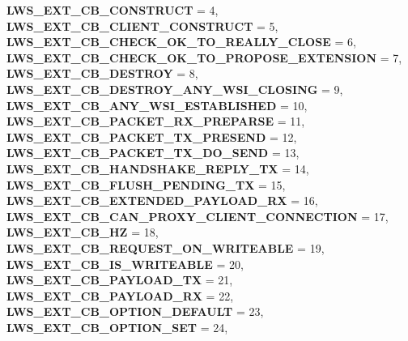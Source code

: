 \begin{DoxyCompactItemize}
{\bfseries L\+W\+S\+\_\+\+E\+X\+T\+\_\+\+C\+B\+\_\+\+C\+O\+N\+S\+T\+R\+U\+CT} = 4, 
\newline
{\bfseries L\+W\+S\+\_\+\+E\+X\+T\+\_\+\+C\+B\+\_\+\+C\+L\+I\+E\+N\+T\+\_\+\+C\+O\+N\+S\+T\+R\+U\+CT} = 5, 
{\bfseries L\+W\+S\+\_\+\+E\+X\+T\+\_\+\+C\+B\+\_\+\+C\+H\+E\+C\+K\+\_\+\+O\+K\+\_\+\+T\+O\+\_\+\+R\+E\+A\+L\+L\+Y\+\_\+\+C\+L\+O\+SE} = 6, 
{\bfseries L\+W\+S\+\_\+\+E\+X\+T\+\_\+\+C\+B\+\_\+\+C\+H\+E\+C\+K\+\_\+\+O\+K\+\_\+\+T\+O\+\_\+\+P\+R\+O\+P\+O\+S\+E\+\_\+\+E\+X\+T\+E\+N\+S\+I\+ON} = 7, 
{\bfseries L\+W\+S\+\_\+\+E\+X\+T\+\_\+\+C\+B\+\_\+\+D\+E\+S\+T\+R\+OY} = 8, 
\newline
{\bfseries L\+W\+S\+\_\+\+E\+X\+T\+\_\+\+C\+B\+\_\+\+D\+E\+S\+T\+R\+O\+Y\+\_\+\+A\+N\+Y\+\_\+\+W\+S\+I\+\_\+\+C\+L\+O\+S\+I\+NG} = 9, 
{\bfseries L\+W\+S\+\_\+\+E\+X\+T\+\_\+\+C\+B\+\_\+\+A\+N\+Y\+\_\+\+W\+S\+I\+\_\+\+E\+S\+T\+A\+B\+L\+I\+S\+H\+ED} = 10, 
{\bfseries L\+W\+S\+\_\+\+E\+X\+T\+\_\+\+C\+B\+\_\+\+P\+A\+C\+K\+E\+T\+\_\+\+R\+X\+\_\+\+P\+R\+E\+P\+A\+R\+SE} = 11, 
{\bfseries L\+W\+S\+\_\+\+E\+X\+T\+\_\+\+C\+B\+\_\+\+P\+A\+C\+K\+E\+T\+\_\+\+T\+X\+\_\+\+P\+R\+E\+S\+E\+ND} = 12, 
\newline
{\bfseries L\+W\+S\+\_\+\+E\+X\+T\+\_\+\+C\+B\+\_\+\+P\+A\+C\+K\+E\+T\+\_\+\+T\+X\+\_\+\+D\+O\+\_\+\+S\+E\+ND} = 13, 
{\bfseries L\+W\+S\+\_\+\+E\+X\+T\+\_\+\+C\+B\+\_\+\+H\+A\+N\+D\+S\+H\+A\+K\+E\+\_\+\+R\+E\+P\+L\+Y\+\_\+\+TX} = 14, 
{\bfseries L\+W\+S\+\_\+\+E\+X\+T\+\_\+\+C\+B\+\_\+\+F\+L\+U\+S\+H\+\_\+\+P\+E\+N\+D\+I\+N\+G\+\_\+\+TX} = 15, 
{\bfseries L\+W\+S\+\_\+\+E\+X\+T\+\_\+\+C\+B\+\_\+\+E\+X\+T\+E\+N\+D\+E\+D\+\_\+\+P\+A\+Y\+L\+O\+A\+D\+\_\+\+RX} = 16, 
\newline
{\bfseries L\+W\+S\+\_\+\+E\+X\+T\+\_\+\+C\+B\+\_\+\+C\+A\+N\+\_\+\+P\+R\+O\+X\+Y\+\_\+\+C\+L\+I\+E\+N\+T\+\_\+\+C\+O\+N\+N\+E\+C\+T\+I\+ON} = 17, 
{\bfseries L\+W\+S\+\_\+\+E\+X\+T\+\_\+\+C\+B\+\_\+HZ} = 18, 
{\bfseries L\+W\+S\+\_\+\+E\+X\+T\+\_\+\+C\+B\+\_\+\+R\+E\+Q\+U\+E\+S\+T\+\_\+\+O\+N\+\_\+\+W\+R\+I\+T\+E\+A\+B\+LE} = 19, 
{\bfseries L\+W\+S\+\_\+\+E\+X\+T\+\_\+\+C\+B\+\_\+\+I\+S\+\_\+\+W\+R\+I\+T\+E\+A\+B\+LE} = 20, 
\newline
{\bfseries L\+W\+S\+\_\+\+E\+X\+T\+\_\+\+C\+B\+\_\+\+P\+A\+Y\+L\+O\+A\+D\+\_\+\+TX} = 21, 
{\bfseries L\+W\+S\+\_\+\+E\+X\+T\+\_\+\+C\+B\+\_\+\+P\+A\+Y\+L\+O\+A\+D\+\_\+\+RX} = 22, 
{\bfseries L\+W\+S\+\_\+\+E\+X\+T\+\_\+\+C\+B\+\_\+\+O\+P\+T\+I\+O\+N\+\_\+\+D\+E\+F\+A\+U\+LT} = 23, 
{\bfseries L\+W\+S\+\_\+\+E\+X\+T\+\_\+\+C\+B\+\_\+\+O\+P\+T\+I\+O\+N\+\_\+\+S\+ET} = 24, 
\newline

\end{DoxyCompactItemize}

